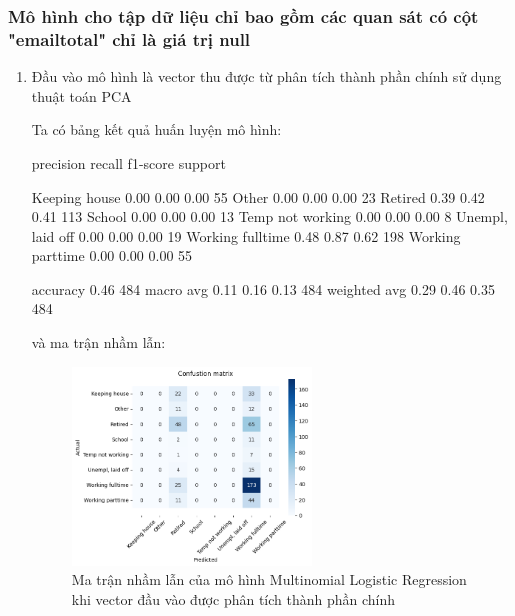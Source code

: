 \subsubsection{Mô hình cho tập dữ liệu chỉ bao gồm các quan sát có cột "emailtotal" chỉ là giá trị null}


\begin{enumerate}[label=(\alph*)]
    \item Đầu vào mô hình là vector thu được từ phân tích thành phần chính sử dụng thuật toán PCA
    
    Ta có bảng kết quả huấn luyện mô hình:

    \begin{python}
                    precision    recall  f1-score   support

   Keeping house       0.00      0.00      0.00        55
           Other       0.00      0.00      0.00        23
         Retired       0.39      0.42      0.41       113
          School       0.00      0.00      0.00        13
Temp not working       0.00      0.00      0.00         8
Unempl, laid off       0.00      0.00      0.00        19
Working fulltime       0.48      0.87      0.62       198
Working parttime       0.00      0.00      0.00        55

        accuracy                           0.46       484
       macro avg       0.11      0.16      0.13       484
    weighted avg       0.29      0.46      0.35       484
    \end{python}

    và ma trận nhầm lẫn:

    \begin{figure}[H]
        \centering
        \includegraphics[width=0.6\textwidth]{figures/Thanh/Models/Logistic/With_null_models_confusion_matrix_Logistic_PCA_features.png}
        \caption{Ma trận nhầm lẫn của mô hình Multinomial Logistic Regression khi vector đầu vào được phân tích thành phần chính}
        \label{fig:With_null_models_confusion_matrix_Logistic_PCA_features}
    \end{figure}


\end{enumerate}
